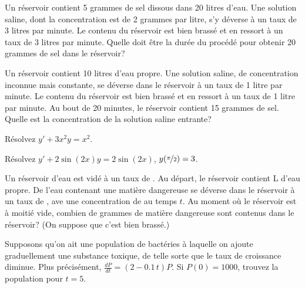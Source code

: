\begin{exercise}
	Un réservoir contient 5 grammes de sel dissous dans 20 litres d'eau.
	Une solution saline, dont la concentration est de 2 grammes par litre,
	s'y déverse à un taux de 3 litres par minute.
	Le contenu du réservoir est bien brassé et en ressort à un taux de 3 litres par minute. Quelle doit être la durée du procédé pour obtenir 20 grammes de sel dans le réservoir?
\end{exercise}

\begin{exercise}
	Un réservoir contient 10 litres d'eau propre.
	Une solution saline, de concentration inconnue mais constante, se déverse dans le réservoir à un taux de 1 litre par minute.
	Le contenu du réservoir est bien brassé et en ressort à un taux de 1 litre par minute.
	Au bout de 20 minutes, le réservoir contient 15 grammes de sel.  Quelle est la concentration de la solution saline entrante?
\end{exercise}

\setcounter{exercise}{100}

\begin{exercise}
	Résolvez $y'+3 x^2 y = x^2$.
\end{exercise}

\begin{exercise}
	Résolvez $y'+ 2\sin(2x) y = 2\sin(2x)$, $y(\nicefrac{\pi}{2}) = 3$.
\end{exercise}

\begin{exercise}
	Un réservoir d'eau est vidé à un taux de .
	Au départ, le réservoir contient \unit[10]{L} d'eau propre.
	De l'eau contenant une matière dangereuse se déverse dans le réservoir à un taux de ,
	ave une concentration de  au temps $t$.
	Au moment où le réservoir est à moitié vide, combien de grammes de matière dangereuse sont contenus dans le réservoir?
	(On suppose que c'est bien brassé.)
\end{exercise}

\begin{exercise}
	Supposons qu'on ait une population de bactéries à laquelle on ajoute graduellement une substance toxique,
	de telle sorte que le taux de croissance diminue.  Plus précisément, $\frac{dP}{dt} = (2-0.1\,t)P$.
	Si $P(0) = 1000$, trouvez la population pour $t=5$.
\end{exercise}

